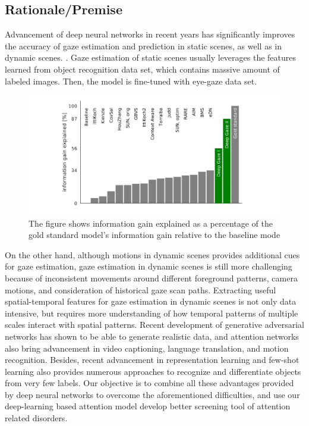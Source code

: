 \documentclass[a4paper, times, 12pt, ,onecolumn,oneside,top=1.0cm,bottom=1.0cm,left=1.0 cm,right=1cm]{article}
\begin{document}
\subsection{Rationale/Premise}
Advancement of deep neural networks in recent years has significantly improves the accuracy of gaze estimation and prediction in static scenes\cite{dg1}\cite{dg2}, as well as in dynamic  scenes.\cite{DGAZE} \cite{VSP-STRAN} \cite{Zhang_2017_CVPR}. Gaze estimation of static scenes usually leverages the features learned from object recognition data set, which contains massive amount of labeled images. Then, the model is fine-tuned with eye-gaze data set.
\begin{figure}{\textwidth}
  \centering
  \includegraphics[scale = 0.4]{imgs/dg2_benchmark2.png}
  \caption{ The figure shows information gain explained as a  percentage of the gold standard model’s information gain relative to the baseline mode \cite{dg2}}
\end{figure}

On the other hand, although motions in dynamic scenes provides additional cues for gaze estimation, gaze estimation in dynamic scenes is still more challenging because of inconsistent movements around different foreground patterns, camera motions, and consideration of historical gaze scan paths. Extracting useful spatial-temporal features for gaze estimation in dynamic scenes is not only data intensive, but requires more understanding of how temporal patterns of multiple scales interact with spatial patterns. Recent development of generative adversarial networks has shown to be able to generate realistic data, and attention networks also bring advancement in video captioning, language translation, and motion recognition. Besides, recent advancement in representation learning and few-shot learning also provides numerous approaches to recognize and differentiate objects from very few labels. Our objective is to combine all these advantages provided by deep neural networks to overcome the aforementioned difficulties, and use our deep-learning based attention model develop better screening tool of attention related disorders. 
\end{document}
